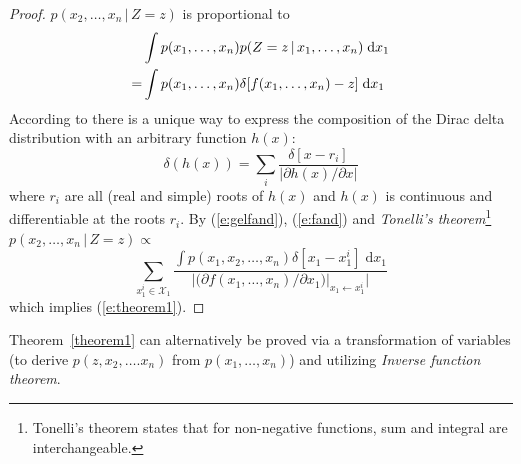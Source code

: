 \documentclass{article}
\newcommand{\pr}{p}
\newcommand{\dd}{\;\mathrm{d}} %
\begin{document}
\begin{proof}
$p(x_2, \ldots, x_n \,|\, Z=z)$ is proportional to
\begin{align}
%
%
%
&\int p(x_1, \ldots, x_n)p(Z=z \,|\, x_1, \ldots, x_n) \dd x_1 \notag\\
%
=&\int p(x_1, \ldots, x_n)
\delta[f(x_1, \ldots, x_n) - z] \dd x_1 
\label{e:fand}
\end{align}
According to \cite{gel1964generalized}
there is a unique way to express the composition of the Dirac delta distribution with an
arbitrary function $h(x)$:
\begin{equation}
\label{e:gelfand}
\delta(h(x)) = \sum_{i} \frac{\delta[x - r_i]}{|\partial h(x)/\partial x|}
\end{equation}
where $r_i$ are all (real and simple) roots of $h(x)$ and $h(x)$ is continuous and differentiable at the roots $r_i$. By (\ref{e:gelfand}), (\ref{e:fand}) and 
\emph{Tonelli's theorem}\footnote{Tonelli's theorem states that for non-negative functions, sum and integral are interchangeable.} 
$\pr(x_2, \ldots, x_n \,|\, Z = z) \propto$
\begin{equation*}
\sum_{x_1^i \in \mathcal{X}_1}
\frac{\int p(x_1, x_2, \ldots, x_n)  \delta[x_1 - x_1^i] \dd x_1}
{\Big|\big(\partial f(x_1, \ldots, x_n) / \partial x_1 \big)|_{x_1 \leftarrow x_1^i} \Big|}
\end{equation*}
which implies (\ref{e:theorem1}).
\end{proof}

Theorem~\ref{theorem1} can alternatively be proved via a transformation of variables 
(to derive $\pr(z, x_2, \ldots. x_n)$ from $\pr(x_1, \ldots, x_n)$) and utilizing \emph{Inverse function theorem}.
\end{document}
